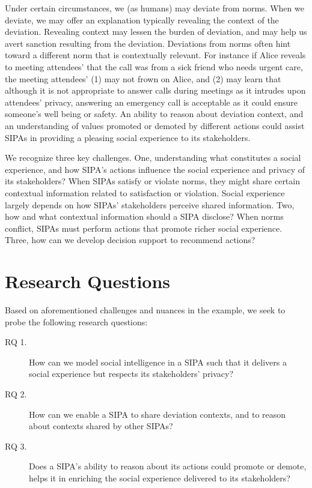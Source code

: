 Under certain circumstances, we (as humans) may deviate from norms. When
we deviate, we may offer an explanation typically revealing the context
of the deviation. Revealing context may lessen the burden of deviation,
and may help us avert sanction resulting from the deviation. Deviations
from norms often hint toward a different norm that is contextually
relevant. For instance if Alice reveals to meeting attendees' that the
call was from a sick friend who needs urgent care, the meeting
attendees' (1) may not frown on Alice, and (2) may learn that although
it is not appropriate to answer calls during meetings as it intrudes
upon attendees' privacy, answering an emergency call is acceptable as it
could ensure someone's well being or safety. An ability to reason about
deviation context, and an understanding of values promoted or demoted by different
actions could assist SIPAs in providing a pleasing social experience to
its stakeholders.

We recognize three key challenges. One, understanding what constitutes a
social experience, and how SIPA's actions influence the social
experience and privacy of its stakeholders? When SIPAs satisfy or violate
norms, they might share certain contextual information related to
satisfaction or violation. Social experience largely depends on how
SIPAs' stakeholders perceive shared information. Two, how and what
contextual information should a SIPA disclose? When norms conflict,
SIPAs must perform actions that promote richer social experience. Three,
how can we develop decision support to recommend actions?

\section{Research Questions}
\label{sec:intro-questions}

Based on aforementioned challenges and nuances in the example, we seek 
to probe the following research questions: 

\begin{description}

\item[RQ 1.] How can we model social intelligence in a SIPA such that it
delivers a social experience but respects its stakeholders' privacy?

\item[RQ 2.] How can we enable a SIPA to share deviation contexts, and to
reason about contexts shared by other SIPAs? 

\item[RQ 3.] Does a SIPA's ability to reason about  its actions could promote or demote, helps it in enriching the social
experience delivered to its stakeholders?

\end{description}


